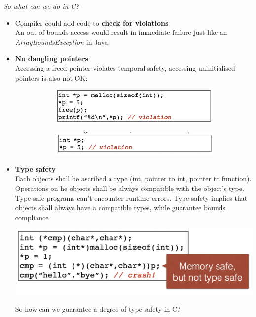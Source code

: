 \documentclass[11pt, oneside]{article}   	%
\begin{document}
\emph{So what can we do in C?}
\begin{itemize}
\item Compiler could add code to \textbf{check for violations}\\
An out-of-bounds access would result in immediate failure just like an \emph{ArrayBoundsException} in Java.
\item \textbf{No dangling pointers}\\
Accessing a freed pointer violates temporal safety, accessing uninitialised pointers is also not OK:
\begin{figure}[H]
\begin{subfigure}[H]{0.5\linewidth}
\includegraphics[width=\linewidth]{sef1}
\end{subfigure}
\begin{subfigure}[H]{0.5\linewidth}
\includegraphics[width=\linewidth]{sef2}
\end{subfigure}%
\end{figure}
\item \textbf{Type safety}\\
Each objects shall be ascribed a type (int, pointer to int, pointer to function).\\
Operations on he objects shall be always compatible with the object's type. Type safe programs can't encounter runtime errors. Type safety implies that objects shall always have a compatible types, while guarantee bounds compliance
\begin{center}
\includegraphics[scale = 0.6]{tsef}
\end{center}
So how can we guarantee a degree of type safety in C?

\end{itemize}
\end{document}
